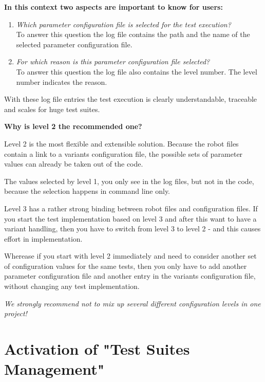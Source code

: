 \textbf{In this context two aspects are important to know for users:}

\begin{enumerate}
   \item \textit{Which parameter configuration file is selected for the test execution?}\\
To answer this question the log file contains the path and the name of the selected parameter configuration file.
   \item \textit{For which reason is this parameter configuration file selected?}\\
To answer this question the log file also contains the level number. The level number indicates the reason.
\end{enumerate}

With these log file entries the test execution is clearly understandable, traceable and scales for huge test suites.

\vspace{2ex}

\textbf{Why is level 2 the recommended one?}

Level 2 is the most flexible and extensible solution. Because the robot files contain a link to a variants configuration file,
the possible sets of parameter values can already be taken out of the code.

The values selected by level 1, you only see in the log files, but not in the code, because the selection happens in command line only.

Level 3 has a rather strong binding between robot files and configuration files. If you start the test implementation based on level 3
and after this want to have a variant handling, then you have to switch from level 3 to level 2 - and this causes effort in implementation.

Wherease if you start with level 2 immediately and need to consider another set of configuration values for the same tests, then you only have to add
another parameter configuration file and another entry in the variants configuration file, without changing any test implementation.

\textit{We strongly recommend not to mix up several different configuration levels in one project!}


\section{Activation of "Test Suites Management"}

